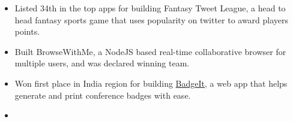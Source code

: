 \documentclass[letterpaper]{article}
\begin{document}
\begin{itemize}
    \item {} \vspace{6pt}         
        \linebreak
        \small{Listed 34th in the top apps for building Fantasy Tweet League, a head to head fantasy sports game that uses popularity on twitter \linebreak to award players points.}\normalsize\vspace{-6pt}
    \item {} \vspace{6pt}         
        \linebreak
        \small{Built BrowseWithMe, a NodeJS based real-time collaborative browser for multiple users, and was declared winning team.}\normalsize\vspace{-6pt}
    \item {} \vspace{6pt}         
        \linebreak
        \small{Won first place in India region for building \href{http://makkarlabs.in/badgeit}{BadgeIt}, a web app that helps generate and print conference badges with ease.}\normalsize
\end{itemize}

\begin{itemize}
    \item {}
        \begin{itemize}
        \end{itemize}
    \end{itemize}
\end{document}
